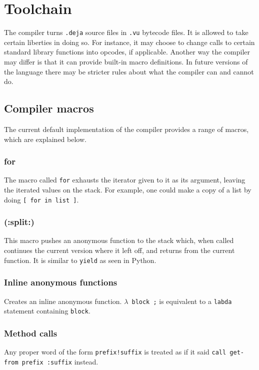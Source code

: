 \chapter{Toolchain}

The compiler turns \verb!.deja! source files in \verb!.vu! bytecode files. It
is allowed to take certain liberties in doing so. For instance, it may choose
to change calls to certain standard library functions into opcodes, if
applicable. Another way the compiler may differ is that it can provide built-in
macro definitions. In future versions of the language there may be stricter
rules about what the compiler can and cannot do. 

\section{Compiler macros}

The current default implementation of the compiler provides a range of
macros, which are explained below.

\subsection{for}
The macro called \verb!for! exhausts the iterator given to it as its
argument, leaving the iterated values on the stack. For example, one
could make a copy of a list by doing \verb![ for in list ]!.
\subsection{(:split:)}
This macro pushes an anonymous function to the stack which, when called
continues the current version where it left off, and returns from the
current function. It is similar to \verb!yield! as seen in Python.
\subsection{Inline anonymous functions}
Creates an inline anonymous function. $\lambda$\verb! block ;! is
equivalent to a \verb!labda! statement containing \verb!block!.
\subsection{Method calls}
Any proper word of the form \verb#prefix!suffix# is treated as if it
said \verb#call get-from prefix :suffix# instead.
